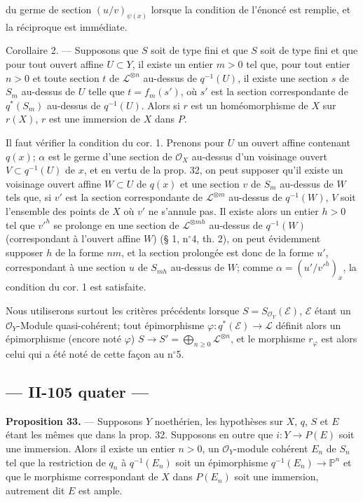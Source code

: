 \hfill {}

du germe de section $(u/v)_{\psi(x)}$ lorsque la condition de l'énoncé est remplie, et la réciproque est immédiate.

Corollaire 2. --- Supposons que $S$ soit de type fini et que $S$ soit de type fini et que pour tout ouvert affine $U \subset Y$, il existe un entier $m > 0$ tel que, pour tout entier $n > 0$ et toute section $t$ de $\mathcal{L}^{\otimes n}$ au-dessus de $q^{-1}(U)$, il existe une section $s$ de $S_m$ au-dessus de $U$ telle que $t = f_m(s')$, où $s'$ est la section correspondante de $q^*(S_m)$ au-dessus de $q^{-1}(U)$. Alors si $r$ est un homéomorphisme de $X$ sur $r(X)$, $r$ est une immersion de $X$ dans $P$.

Il faut vérifier la condition du cor. 1. Prenons pour $U$ un ouvert affine contenant $q(x)$; $\alpha$ est le germe d'une section de $\mathcal{O}_X$ au-dessus d'un voisinage ouvert $V \subset q^{-1}(U)$ de $x$, et en vertu de la prop. 32, on peut supposer qu'il existe un voisinage ouvert affine $W \subset U$ de $q(x)$ et une section $v$ de $S_m$ au-dessus de $W$ tels que, si $v'$ est la section correspondante de $\mathcal{L}^{\otimes m}$ au-dessus de $q^{-1}(W)$, $V$ soit l'ensemble des points de $X$ où $v'$ ne s'annule pas. Il existe alors un entier $h > 0$ tel que $v'^h$ se prolonge en une section de $\mathcal{L}^{\otimes mh}$ au-dessus de $q^{-1}(W)$ (correspondant à l'ouvert affine $W$) (§ 1, n$^\circ$4, th. 2), on peut évidemment supposer $h$ de la forme $nm$, et la section prolongée est donc de la forme $u'$, correspondant à une section $u$ de $S_{mh}$ au-dessus de $W$; comme $\alpha = (u'/v'^h)_x$, la condition du cor. 1 est satisfaite.

Nous utiliserons surtout les critères précédents lorsque $S = S_{\mathcal{O}_Y}(\mathcal{E})$, $\mathcal{E}$ étant un $\mathcal{O}_Y$-Module quasi-cohérent; tout épimorphisme $\varphi : q^*(\mathcal{E}) \to \mathcal{L}$ définit alors un épimorphisme (encore noté $\varphi$) $S \to S' = \bigoplus_{n \geq 0} \mathcal{L}^{\otimes n}$, et le morphisme $r_{\varphi}$ est alors celui qui a été noté de cette façon au n$^\circ$5.

\newpage


\subsection*{— II-105 quater —}

\textbf{Proposition 33.} — Supposons $Y$ noethérien, les hypothèses sur $X$, $q$, $S$ et $E$ étant les mêmes que dans la prop. 32. Supposons en outre que $i: Y \to P(E)$ soit une immersion. Alors il existe un entier $n > 0$, un $\mathcal{O}_Y$-module cohérent $E_n$ de $S_n$ tel que la restriction de $q_n$ à $q^{-1}(E_n)$ soit un épimorphisme $q^{-1}(E_n) \to \mathbb{P}^n$ et que le morphisme correspondant de $X$ dans $P(E_n)$ soit une immersion, autrement dit $E$ est ample.

